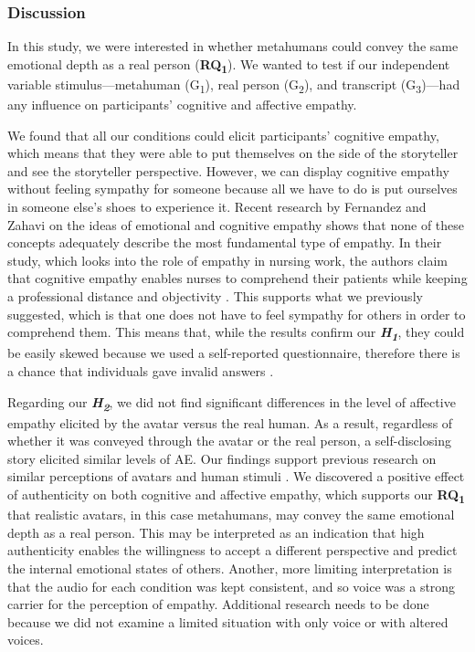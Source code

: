 \subsubsection{Discussion}
In this study, we were interested in whether metahumans could convey the same emotional depth as a real person (\textbf{RQ\textsubscript{1}}). We wanted to test if our independent variable stimulus---metahuman (G\textsubscript{1}), real person (G\textsubscript{2}), and transcript (G\textsubscript{3})---had any influence on participants' cognitive and affective empathy.

We found that all our conditions could elicit participants' cognitive empathy, which means that they were able to put themselves on the side of the storyteller and see the storyteller perspective. However, we can display cognitive empathy without feeling sympathy for someone because all we have to do is put ourselves in someone else's shoes to experience it. Recent research by Fernandez and Zahavi \cite{FER20} on the ideas of emotional and cognitive empathy shows that none of these concepts adequately describe the most fundamental type of empathy. In their study, which looks into the role of empathy in nursing work, the authors claim that cognitive empathy enables nurses to comprehend their patients while keeping a professional distance and objectivity \cite{FER20}. This supports what we previously suggested, which is that one does not have to feel sympathy for others in order to comprehend them. 
This means that, while the results confirm our \textbf{\textit{H\textsubscript{1}}}, they could be easily skewed because we used a self-reported questionnaire, therefore there is a chance that individuals gave invalid answers \cite{DEM15}.

Regarding our \textbf{\textit{H\textsubscript{2}}}, we did not find significant differences in the level of affective empathy elicited by the avatar versus the real human. As a result, regardless of whether it was conveyed through the avatar or the real person, a self-disclosing story elicited similar levels of AE. Our findings support previous research on similar perceptions of avatars and human stimuli \cite{ALI15, ROT19}. We discovered a positive effect of authenticity on both cognitive and affective empathy, which supports our \textbf{RQ\textsubscript{1}} that realistic avatars, in this case metahumans, may convey the same emotional depth as a real person. This may be interpreted as an indication that high authenticity enables the willingness to accept a different perspective and predict the internal emotional states of others. Another, more limiting interpretation is that the audio for each condition was kept consistent, and so voice was a strong carrier for the perception of empathy. Additional research needs to be done because we did not examine a limited situation with only voice or with altered voices.

